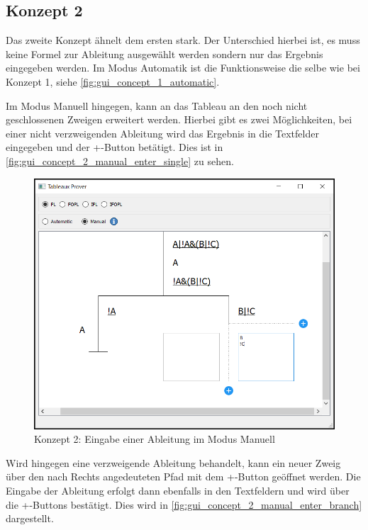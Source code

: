 \subsection{Konzept 2}
Das zweite Konzept ähnelt dem ersten stark. Der Unterschied hierbei ist, es muss keine Formel zur Ableitung ausgewählt werden sondern nur das Ergebnis eingegeben werden. Im Modus Automatik ist die Funktionsweise die selbe wie bei Konzept 1, siehe \autoref{fig:gui_concept_1_automatic}.

Im Modus Manuell hingegen, kann an das Tableau an den noch nicht geschlossenen Zweigen erweitert werden. Hierbei gibt es zwei Möglichkeiten, bei einer nicht verzweigenden Ableitung wird das Ergebnis in die Textfelder eingegeben und der +-Button betätigt. Dies ist in \autoref{fig:gui_concept_2_manual_enter_single} zu sehen.
\begin{figure}[h]
\begin{center}
\includegraphics[scale=0.7]{images/gui_concept_2_manual_enter_single.png}
\caption{Konzept 2: Eingabe einer Ableitung im Modus Manuell}
\label{fig:gui_concept_2_manual_enter_single}
\end{center}
\end{figure}

Wird hingegen eine verzweigende Ableitung behandelt, kann ein neuer Zweig über den nach Rechts angedeuteten Pfad mit dem +-Button geöffnet werden. Die Eingabe der Ableitung erfolgt dann ebenfalls in den Textfeldern und wird über die +-Buttons bestätigt. Dies wird in \autoref{fig:gui_concept_2_manual_enter_branch} dargestellt.

